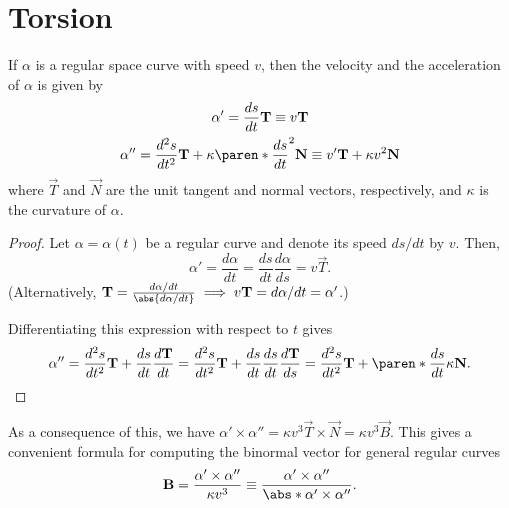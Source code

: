 \documentclass[11pt]{penrose}
\newcommand{\vT}{\vec{T}}
\newcommand{\vN}{\vec{N}}
\newcommand{\vB}{\vec{B}}
\begin{document}
\section{Torsion}

\begin{nlemma}
    If $\alpha$ is a regular space curve with speed $v$, then the velocity and the acceleration of $\alpha$ is given by
    \begin{gather}
        \alpha' = \frac{ds}{dt} \vT \equiv v \vT\\
        \alpha'' = \frac{d^2 s}{dt^2} \vT + \kappa \paren*{\frac{ds}{dt}}^2 \vN \equiv v' \vT + \kappa v^2 \vN
    \end{gather}
    where $\vT$ and $\vN$ are the unit tangent and normal vectors, respectively, and $\kappa$ is the curvature of $\alpha$.
\end{nlemma}
\begin{proof}
    Let $\alpha = \alpha(t)$ be a regular curve and denote its speed $ds/dt$ by $v$. Then,
    \begin{equation}
        \alpha'
        = \frac{d\alpha}{dt}
        = \frac{ds}{dt} \frac{d\alpha}{ds}
        = v \vT.
    \end{equation}
    (Alternatively, $\vT = \frac{d\alpha/dt}{\abs{d\alpha/dt}} \implies v \vT = d\alpha/dt = \alpha'$.)

    Differentiating this expression with respect to $t$ gives
    \begin{equation}
        \alpha''
        = \frac{d^2 s}{dt^2} \vT + \frac{ds}{dt} \frac{d\vT}{dt}
        = \frac{d^2 s}{dt^2} \vT + \frac{ds}{dt} \frac{ds}{dt} \frac{d\vT}{ds}
        = \frac{d^2 s}{dt^2} \vT + \paren*{\frac{ds}{dt}} \kappa \vN.
    \end{equation}
\end{proof}

As a consequence of this, we have $\alpha' \times \alpha'' = \kappa v^3 \vT \times \vN = \kappa v^3 \vB$. This gives a convenient formula for computing the binormal vector for general regular curves
\begin{equation}
    \vB = \frac{\alpha' \times \alpha''}{\kappa v^3} \equiv \frac{\alpha' \times \alpha''}{\abs*{\alpha' \times \alpha''}}.
\end{equation}
\end{document}
